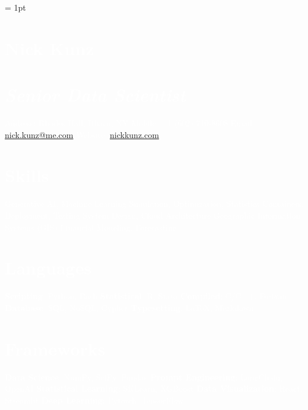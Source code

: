 \documentclass{article}
\author{Nick Kunz}
\begin{document}
\noindent
\scriptsize
{}\font = 1pt
    \begin{bgbox}[
        height = \paperheight,
        width = 0.3\textwidth,
        colback = gray
    ]
        \textcolor{white}{
            \section*{Nick Kunz}
            \section*{\textit{\normalsize{Senior Data Scientist}}}
                Address: \space\space\space{} Rhodes Hall, Ithaca, NY\newline
                Mobile: \space\space\space\space +1 $($602$)$ 710-8608\newline
                Email: \space\space\space\space\space\space\space\url{nick.kunz@me.com}\newline
                Website: \space\space\space\url{nickkunz.com}
            \section*{Skills}
                Generative AI, Machine Learning\newline
                Simulation, Optimization, Statistics\newline
                Containers, Deployment, Testing\newline
                System Design, Cloud Architecture\newline
                Geographic Information Systems (GIS)\newline
                Financial Modeling, Forecasting
            \section*{Languages}
                \textbf{Scripting}: Python, Bash\newline
                \textbf{Statistical}: R, Stata\newline
                \textbf{Compiled}: C/C++, Fortran\newline
                \textbf{Database}: SQL, NoSQL, Cypher\newline
                \textbf{Typesetting}: \LaTeX, Markdown
            \section*{Frameworks}
                \textbf{Data Science}: NumPy, SciPy, Pandas\newline
                \textbf{Prompt Engineering}: LangChain, OpenAI\newline
                \textbf{Statistical Learning}: SKLearn, XGBoost\newline
                \textbf{Data Visualization}: React, Streamlit\newline
                \textbf{Deep Learning}: Pytorch, TensorFlow
}
\end{bgbox}
\end{document}
